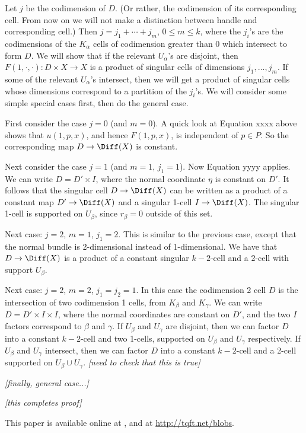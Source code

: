 \documentclass[11pt,leqno]{amsart}
\def\nn#1{{{\it \small [#1]}}}
\begin{document}
Let $j$ be the codimension of $D$.
(Or rather, the codimension of its corresponding cell.  From now on we will not make a distinction
between handle and corresponding cell.)
Then $j = j_1 + \cdots + j_m$, $0 \le m \le k$,
where the $j_i$'s are the codimensions of the $K_\alpha$
cells of codimension greater than 0 which intersect to form $D$.
We will show that
if the relevant $U_\alpha$'s are disjoint, then
$F(1, \cdot, \cdot) : D\times X \to X$
is a product of singular cells of dimensions $j_1, \ldots, j_m$.
If some of the relevant $U_\alpha$'s intersect, then we will get a product of singular
cells whose dimensions correspond to a partition of the $j_i$'s.
We will consider some simple special cases first, then do the general case.

First consider the case $j=0$ (and $m=0$).
A quick look at Equation xxxx above shows that $u(1, p, x)$, and hence $F(1, p, x)$,
is independent of $p \in P$.
So the corresponding map $D \to \Diff(X)$ is constant.

Next consider the case $j = 1$ (and $m=1$, $j_1=1$).
Now Equation yyyy applies.
We can write $D = D'\times I$, where the normal coordinate $\eta$ is constant on $D'$.
It follows that the singular cell $D \to \Diff(X)$ can be written as a product
of a constant map $D' \to \Diff(X)$ and a singular 1-cell $I \to \Diff(X)$.
The singular 1-cell is supported on $U_\beta$, since $r_\beta = 0$ outside of this set.

Next case: $j=2$, $m=1$, $j_1 = 2$.
This is similar to the previous case, except that the normal bundle is 2-dimensional instead of
1-dimensional.
We have that $D \to \Diff(X)$ is a product of a constant singular $k{-}2$-cell
and a 2-cell with support $U_\beta$.

Next case: $j=2$, $m=2$, $j_1 = j_2 = 1$.
In this case the codimension 2 cell $D$ is the intersection of two
codimension 1 cells, from $K_\beta$ and $K_\gamma$.
We can write $D = D' \times I \times I$, where the normal coordinates are constant
on $D'$, and the two $I$ factors correspond to $\beta$ and $\gamma$.
If $U_\beta$ and $U_\gamma$ are disjoint, then we can factor $D$ into a constant $k{-}2$-cell and
two 1-cells, supported on $U_\beta$ and $U_\gamma$ respectively.
If $U_\beta$ and $U_\gamma$ intersect, then we can factor $D$ into a constant $k{-}2$-cell and
a 2-cell supported on $U_\beta \cup U_\gamma$.
\nn{need to check that this is true}

\nn{finally, general case...}

\nn{this completes proof}






This paper is available online at , and at
\url{http://tqft.net/blobs}.

\end{document}
